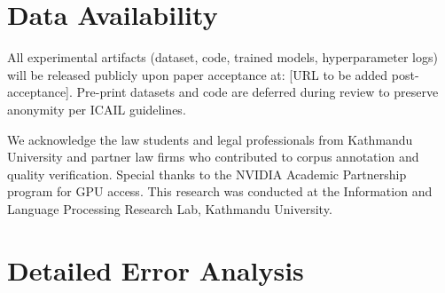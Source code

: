 \documentclass[manuscript, screen, review]{acmart}
\begin{document}
\section*{Data Availability}
\label{sec:data_availability}

All experimental artifacts (dataset, code, trained models, hyperparameter logs) will be released publicly upon paper acceptance at: [URL to be added post-acceptance]. Pre-print datasets and code are deferred during review to preserve anonymity per ICAIL guidelines.

\begin{acks}
We acknowledge the law students and legal professionals from Kathmandu University and partner law firms who contributed to corpus annotation and quality verification. Special thanks to the NVIDIA Academic Partnership program for GPU access. This research was conducted at the Information and Language Processing Research Lab, Kathmandu University.
\end{acks}




\appendix

\section{Detailed Error Analysis}
\label{app:error_analysis}

\end{document}
